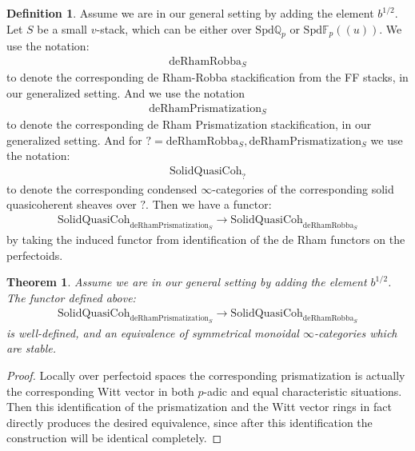 \documentclass[12pt]{article}
\newtheorem{theorem}{Theorem}
\theoremstyle{definition}
\newtheorem{definition}{Definition}
\begin{document}
\begin{definition}
Assume we are in our general setting by adding the element $b^{1/2}$. Let $S$ be a small $v$-stack, which can be either over $\mathrm{Spd}\mathbb{Q}_p$ or $\mathrm{Spd}\mathbb{F}_p((u))$. We use the notation:
\begin{align}
\mathrm{deRhamRobba}_S
\end{align}
to denote the corresponding de Rham-Robba stackification from the FF stacks, in our generalized setting. And we use the notation
\begin{align}
\mathrm{deRhamPrismatization}_S
\end{align}
to denote the corresponding de Rham Prismatization stackification, in our generalized setting. And for $?= \mathrm{deRhamRobba}_S, \mathrm{deRhamPrismatization}_S$ we use the notation:
\begin{align}
\mathrm{SolidQuasiCoh}_?
\end{align}
to denote the corresponding condensed $\infty$-categories of the corresponding solid quasicoherent sheaves over $?$. Then we have a functor:
\begin{align}
\mathrm{SolidQuasiCoh}_{\mathrm{deRhamPrismatization}_S}\rightarrow \mathrm{SolidQuasiCoh}_{\mathrm{deRhamRobba}_S}
\end{align}
by taking the induced functor from identification of the de Rham functors on the perfectoids.
\end{definition}


\begin{theorem}
Assume we are in our general setting by adding the element $b^{1/2}$. The functor defined above:
\begin{align}
\mathrm{SolidQuasiCoh}_{\mathrm{deRhamPrismatization}_S}\rightarrow \mathrm{SolidQuasiCoh}_{\mathrm{deRhamRobba}_S}
\end{align}
is well-defined, and an equivalence of symmetrical monoidal $\infty$-categories which are stable.

\end{theorem}

\begin{proof}
Locally over perfectoid spaces the corresponding prismatization is actually the corresponding Witt vector in both $p$-adic and equal characteristic situations. Then this identification of the prismatization and the Witt vector rings in fact directly produces the desired equivalence, since after this identification the construction will be identical completely.
\end{proof}
\end{document}
